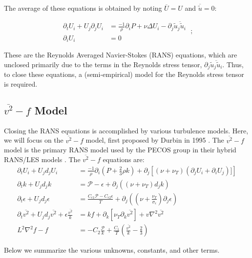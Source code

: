 \documentclass[12pt]{article}
\newcommand{\ep}{\epsilon} \newcommand{\noi}{\noindent}
\newcommand{\pr}{\partial}
\begin{document}
\noi The average of these equations is obtained by noting $\overline{U} = U$ and
$\overline{\tilde{u}} = 0$: 

\begin{equation}
	\begin{split}
		\pr_t U_i + U_j \pr_j U_i &= \frac{-1}{\rho} \pr_i P + \nu
		\Delta U_i - \pr_j \overline{\tilde{u}_j \tilde{u}_i} \\
		\pr_i U_i &=0 
	\end{split}
	\label{eq:RANS}
	\; ;
\end{equation}

\noi These are the Reynolds Averaged Navier-Stokes (RANS) equations, 
which are unclosed primarily due to the terms in
the Reynolds stress tensor, $\pr_j \overline{\tilde{u}_j \tilde{u}_i}$. Thus, to
close these equations, a (semi-empirical) model for the Reynolds stress tensor
is required. 

\subsection{$\overline{v^2}-f$ Model}

Closing the RANS equations is accomplished by various turbulence models.
Here, we will focus on the $\overline{v^2}-f$ model, first proposed by Durbin
in 1995 \cite{v2f}. The $\overline{v^2}-f$ model is the primary RANS model used by the PECOS
group in their hybrid RANS/LES models \cite{thesis}. The $\overline{v^2}-f$
equations are: 
\begin{align}
	\pr_t U_i + U_j d_j U_i &= \frac{-1}{\rho} \pr_i \left( P +
	\frac{2}{3} \rho k \right) + \pr_j \left[ (\nu + \nu_T)(\pr_j U_i + \pr_i
	U_j)]\right] \\
	\pr_t k + U_j d_j k &= \mathcal{P}- \ep + \pr_j \left( (\nu +\nu_T)d_j
	k\right)\\
	\pr_t \ep + U_j d_j \ep &= \frac{C_{\ep 1}\mathcal{P} - C_{\ep 2}
	\ep}{T} + \pr_j \left( (\nu + \frac{\nu_T}{\sigma_\ep}) \pr_j \ep \right)\\
	\pr_t \overline{v^2} + U_j d_j \overline{v^2} + \ep
	\frac{\overline{v^2}}{k} &= kf + \pr_k [ \nu_T \pr_k \overline{v^2}] + v
	\nabla^2 \overline{v^2} \\
	L^2 \nabla^2 f - f &= -C_2 \frac{\mathcal{P}}{k} + \frac{C_1}{T} \left(
	\frac{\overline{v^2}}{k} - \frac{2}{3} \right) 
	\label{eq:v2f}
\end{align}

\noi Below we summarize the various unknowns, constants, and other terms. 
\end{document}
